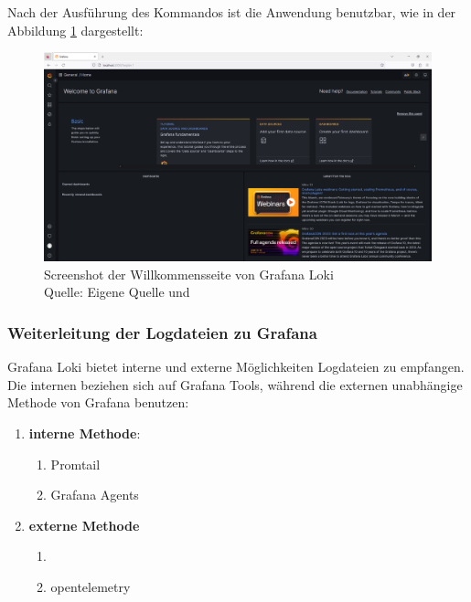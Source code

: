 \newpage
{} 
\thispagestyle{lscape}
\begin{landscape}
   Nach der Ausführung des Kommandos ist die Anwendung benutzbar, wie in der Abbildung \ref{fig:grafana_welcome} dargestellt:
    \begin{figure}[H]
        \centerline{\includegraphics[width=1.5\textwidth]{assets/Installation_Grafana.png}}
        \caption[Screenshot der Willkommensseite von Grafana Loki]
        {Screenshot der Willkommensseite von Grafana Loki\\Quelle: Eigene Quelle und \citep{Grafana_Logs}}
        \label{fig:grafana_welcome}
        \centering
    \end{figure} 
\end{landscape}
\restoregeometry  

\subsubsection{Weiterleitung der Logdateien zu Grafana}
Grafana Loki bietet interne und externe Möglichkeiten Logdateien zu empfangen. Die internen beziehen sich auf Grafana Tools, während die externen unabhängige Methode von Grafana benutzen:

\begin{enumerate}[noitemsep]
   \item \textbf{interne Methode}:
   \begin{enumerate}[noitemsep]
      \item Promtail 
      \item Grafana Agents
   \end{enumerate}
   \item \textbf{externe Methode}
   \begin{enumerate}[noitemsep]
      \item {}
      \item \gls{opentelemetry} 
   \end{enumerate}
\end{enumerate}

